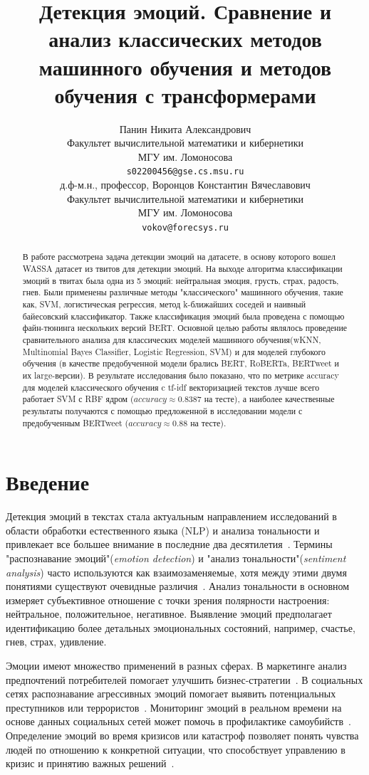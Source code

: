 \documentclass{article}
\title{Детекция эмоций. Сравнение и анализ классических методов машинного обучения и методов обучения с трансформерами}
\author{ Панин Никита Александрович \\
        Факультет вычислительной математики и кибернетики \\
        МГУ им. Ломоносова \\
        \texttt{s02200456@gse.cs.msu.ru} \\
	\And
	д.ф-м.н., профессор, Воронцов Константин Вячеславович \\
        Факультет вычислительной математики и кибернетики \\
        МГУ им. Ломоносова \\
        \texttt{vokov@forecsys.ru} \\
}
\date{}
\begin{document}
\maketitle

\begin{abstract}
	В работе рассмотрена задача детекции эмоций на датасете, в основу которого вошел WASSA датасет из твитов для детекции эмоций. На выходе алгоритма классификации эмоций в твитах была одна из 5 эмоций: нейтральная эмоция, грусть, страх, радость, гнев. Были применены различные методы "классического" машинного обучения, такие как, SVM, логистическая регрессия, метод k-ближайших соседей и наивный байесовский классификатор. Также классификация эмоций была проведена с помощью файн-тюнинга нескольких версий BERT. Основной целью работы являлось проведение сравнительного анализа для классических моделей машинного обучения(wKNN, Multinomial Bayes Classifier, Logistic Regression, SVM) и для моделей глубокого обучения (в качестве предобученной модели брались BERT, RoBERTa, BERTweet и их large-версии). В результате исследования было показано, что по метрике accuracy для моделей классического обучения c tf-idf векторизацией текстов лучше всего работает SVM с RBF ядром ($accuracy \approx 0.8387$ на тесте), а наиболее качественные результаты получаются с помощью предложенной в исследовании модели с предобученным BERTweet ($accuracy \approx 0.88$ на тесте).
\end{abstract}



\section{Введение}
 Детекция эмоций в текстах стала актуальным направлением исследований в области обработки естественного языка (NLP) и анализа тональности и привлекает все большее внимание в последние два десятилетия~\cite{affectdetectionintexts, jiawenfuji}. Термины "распознавание эмоций"({\itshape{emotion detection}}) и  "анализ тональности"({\itshape{sentiment analysis}}) часто используются как взаимозаменяемые, хотя между этими двумя понятиями существуют очевидные различия~\cite{yadollahi}. Анализ тональности в основном измеряет субъективное отношение с точки зрения полярности настроения: нейтральное, положительное, негативное. Выявление эмоций предполагает идентификацию более детальных эмоциональных состояний, например,  счастье, гнев, страх, удивление. 

Эмоции имеют множество применений в разных сферах.  В маркетинге анализ предпочтений потребителей помогает улучшить бизнес-стратегии~\cite{cambria}. В социальных сетях распознавание агрессивных эмоций  помогает выявить потенциальных преступников или террористов~\cite{cheong}. Мониторинг эмоций в реальном времени на основе данных социальных сетей может помочь в профилактике самоубийств~\cite{ren}. Определение эмоций во время кризисов или катастроф позволяет понять чувства людей по отношению к конкретной ситуации, что способствует управлению в кризис и принятию важных решений~\cite{ahmad}. 
\end{document}
